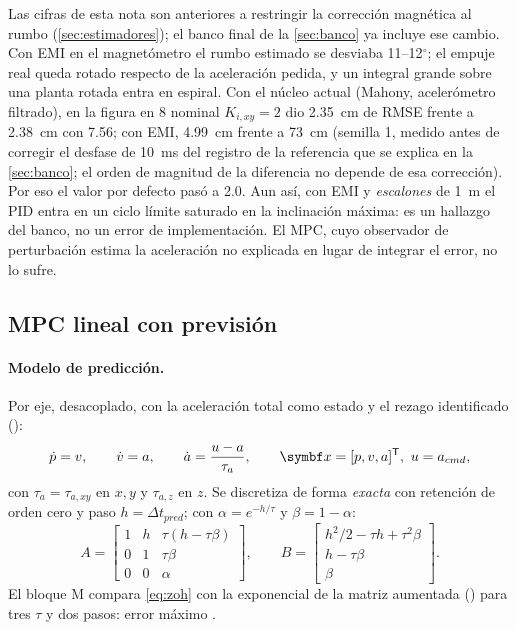 \begin{nota}
Las cifras de esta nota son anteriores a restringir la corrección magnética
al rumbo (\cref{sec:estimadores}); el banco final de la \cref{sec:banco} ya
incluye ese cambio. Con EMI en el magnetómetro el rumbo estimado se desviaba 11--12$^\circ$; el
empuje real queda rotado respecto de la aceleración pedida, y un integral
grande sobre una planta rotada entra en espiral. Con el núcleo actual
(Mahony, acelerómetro filtrado), en la figura en 8 nominal $K_{i,xy}=2$ dio
2.35~cm de RMSE frente a 2.38~cm con 7.56; con EMI, 4.99~cm frente a 73~cm
(semilla 1, medido antes de corregir el desfase de 10~ms del registro de la
referencia que se explica en la \cref{sec:banco}; el orden de magnitud de la
diferencia no depende de esa corrección).
Por eso el valor por defecto pasó a 2.0. Aun así, con EMI y
\emph{escalones} de 1~m el PID entra en un ciclo límite saturado en la
inclinación máxima: es un hallazgo del banco, no un error de
implementación. El MPC, cuyo observador de perturbación estima la
aceleración no explicada en lugar de integrar el error, no lo sufre.
\end{nota}

\subsection{MPC lineal con previsión}

\paragraph{Modelo de predicción.} Por eje, desacoplado, con la aceleración
total como estado y el rezago identificado ():
\begin{equation}
\dot p=v,\qquad \dot v=a,\qquad \dot a=\frac{u-a}{\tau_a},\qquad
\vect x=[p,v,a]\T,\ u=a_{cmd},
\label{eq:mpc_model}
\end{equation}
con $\tau_a=\tau_{a,xy}$ en $x,y$ y $\tau_{a,z}$ en $z$. Se discretiza de
forma \emph{exacta} con retención de orden cero y paso $h=\Delta t_{pred}$;
con $\alpha=e^{-h/\tau}$ y $\beta=1-\alpha$:
\begin{equation}
A=\begin{bmatrix}1&h&\tau(h-\tau\beta)\\0&1&\tau\beta\\0&0&\alpha\end{bmatrix},\qquad
B=\begin{bmatrix}h^2/2-\tau h+\tau^2\beta\\ h-\tau\beta\\ \beta\end{bmatrix}.
\label{eq:zoh}
\end{equation}
El bloque M compara \eqref{eq:zoh} con la exponencial de la matriz aumentada
() para tres $\tau$ y dos pasos: error máximo
.

